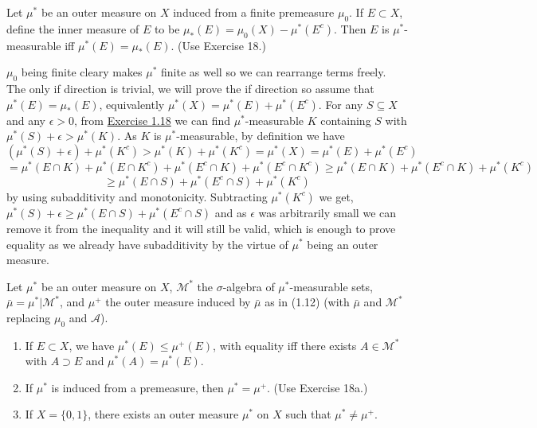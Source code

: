\documentclass[12pt,a4paper]{article}
\begin{document}
\begin{problem}\label{prob:1-19}
Let $\mu^*$ be an outer measure on $X$ induced from a finite premeasure $\mu_0$. If $E \subset X$, define the inner measure of $E$ to be $\mu_*(E) = \mu_0(X) - \mu^*(E^c)$. Then $E$ is $\mu^*$-measurable iff $\mu^*(E) = \mu_*(E)$. (Use Exercise 18.)
\end{problem}
\begin{solution}
    $\mu_0$ being finite cleary makes $\mu^*$ finite as well so we can rearrange terms freely.
    The only if direction is trivial, we will prove the if direction so assume that $\mu^*(E)=\mu_*(E)$, equivalently $\mu^*(X)=\mu^*(E)+\mu^*(E^c)$. 
    For any $S\subseteq X$ and any $\epsilon>0$, from \hyperref[prob:1-18]{Exercise 1.18} we can find $\mu^*$-measurable $K$ containing $S$ with $\mu^*(S)+\epsilon>\mu^*(K)$. 
    As $K$ is $\mu^*$-measurable, by definition we have
    $$(\mu^*(S)+\epsilon)+\mu^*(K^c)>\mu^*(K)+\mu^*(K^c)=\mu^*(X)=\mu^*(E)+\mu^*(E^c)$$
    $$=\mu^*(E\cap K)+\mu^*(E\cap K^c)+\mu^*(E^c\cap K)+\mu^*(E^c\cap K^c)\geq\mu^*(E\cap K)+\mu^*(E^c\cap K)+\mu^*(K^c)$$
    $$\geq\mu^*(E\cap S)+\mu^*(E^c\cap S)+\mu^*(K^c)$$
    by using subadditivity and monotonicity. 
    Subtracting $\mu^*(K^c)$ we get, $\mu^*(S)+\epsilon\geq\mu^*(E\cap S)+\mu^*(E^c\cap S)$ and as $\epsilon$ was arbitrarily small we can remove it from the inequality and it will still be valid, which is enough to prove equality as we already have subadditivity by the virtue of $\mu^*$ being an outer measure.
\end{solution}
\begin{problem}\label{prob:1-20}
Let $\mu^*$ be an outer measure on $X$, $\mathcal{M}^*$ the $\sigma$-algebra of $\mu^*$-measurable sets, $\bar{\mu} = \mu^*|\mathcal{M}^*$, and $\mu^+$ the outer measure induced by $\bar{\mu}$ as in (1.12) (with $\bar{\mu}$ and $\mathcal{M}^*$ replacing $\mu_0$ and $\mathcal{A}$).
\begin{enumerate}[label=\alph*.]
    \item If $E \subset X$, we have $\mu^*(E) \le \mu^+(E)$, with equality iff there exists $A \in \mathcal{M}^*$ with $A \supset E$ and $\mu^*(A) = \mu^*(E)$.
    \item If $\mu^*$ is induced from a premeasure, then $\mu^* = \mu^+$. (Use Exercise 18a.)
    \item If $X = \{0, 1\}$, there exists an outer measure $\mu^*$ on $X$ such that $\mu^* \ne \mu^+$.
\end{enumerate}
\end{problem}
\end{document}

